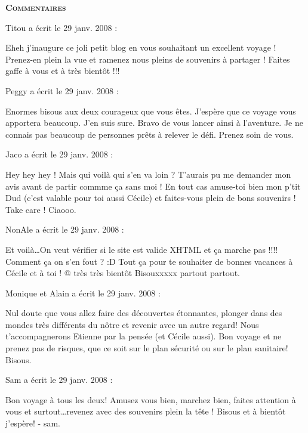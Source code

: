 \bigskip
\textbf{\textsc{Commentaires}}

\medskip
Titou a écrit le 29 janv. 2008 :
\begin{displayquote}
Eheh j'inaugure ce joli petit blog en vous souhaitant un excellent voyage ! Prenez-en plein la vue et ramenez nous pleins de souvenirs à partager ! Faites gaffe à vous et à très bientôt !!!
\end{displayquote}

\medskip
Peggy a écrit le 29 janv. 2008 :
\begin{displayquote}
Enormes bisous aux deux courageux que vous êtes. J'espère que ce voyage vous apportera beaucoup. J'en suis sure. Bravo de vous lancer ainsi à l'aventure. Je ne connais pas beaucoup de personnes prêts à relever le défi. Prenez soin de vous.
\end{displayquote}

\medskip
Jaco a écrit le 29 janv. 2008 :
\begin{displayquote}
Hey hey hey !
Mais qui voilà qui s'en va loin ? T'aurais pu me demander mon avis avant de partir commme ça sans moi !
En tout cas amuse-toi bien mon p'tit Dud (c'est valable pour toi aussi Cécile) et faites-vous plein de bons souvenirs !
Take care !
Ciaooo.
\end{displayquote}

\medskip
NonAle a écrit le 29 janv. 2008 :
\begin{displayquote}
Et voilà\dots On veut vérifier si le site est valide XHTML et ça marche pas !!!! Comment ça on s'en fout ? :D
Tout ça pour te souhaiter de bonnes vacances à Cécile et à toi !
@ très très bientôt
Bisouxxxxx partout partout.
\end{displayquote}

\medskip
Monique et Alain a écrit le 29 janv. 2008 :
\begin{displayquote}
Nul doute que vous allez faire des découvertes étonnantes, plonger dans des mondes très différents du nôtre et revenir avec un autre regard! Nous t'accompagnerons Etienne par la pensée (et Cécile aussi). Bon voyage et ne prenez pas de risques, que ce soit sur le plan sécurité ou sur le plan sanitaire!
Bisous.
\end{displayquote}

\medskip
Sam a écrit le 29 janv. 2008 :
\begin{displayquote}
Bon voyage à tous les deux!
Amusez vous bien, marchez bien, faites attention à vous et surtout\dots revenez avec des souvenirs plein la tête !
Bisous et à bientôt j'espère!
- sam.
\end{displayquote}

